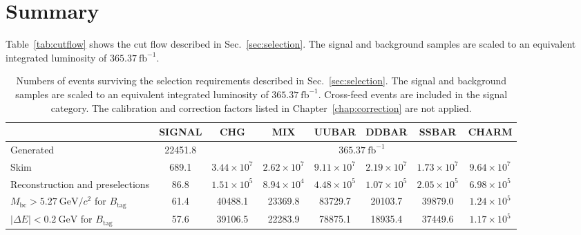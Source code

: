 \section{Summary}
Table~\ref{tab:cutflow} shows the cut flow described in Sec.~\ref{sec:selection}.
The signal and background samples are scaled to an equivalent integrated luminosity of $365.37~\textrm{fb}^{-1}$.
\begin{table}
\caption{
        Numbers of events surviving the selection requirements described
        in Sec.~\ref{sec:selection}.
        The signal and background samples are scaled to an equivalent
        integrated luminosity of $365.37~\textrm{fb}^{-1}$.
        Cross-feed events are included in the signal category.
        The calibration and correction factors listed in
        Chapter~\ref{chap:correction} are not applied.
    }
    \centering
    \renewcommand{\arraystretch}{1.2}
    \setlength{\tabcolsep}{5pt}
    \small

    \begin{tabularx}{0.95\textheight}{
        >{\raggedright\arraybackslash}X ||
        c | c | c | c | c | c | c
    }
        \hline
        \hline

        \multicolumn{1}{c||}{Selection}
        & SIGNAL
        & CHG
        & MIX
        & UUBAR
        & DDBAR
        & SSBAR
        & CHARM \\
        \hline

        Generated
        & 22451.8
        & \multicolumn{6}{c}{$365.37~\textrm{fb}^{-1}$} \\

        Skim
        & 689.1
        & $3.44\times10^{7}$
        & $2.62\times10^{7}$
        & $9.11\times10^{7}$
        & $2.19\times10^{7}$
        & $1.73\times10^{7}$
        & $9.64\times10^{7}$ \\

        Reconstruction and preselections
        & 86.8
        & $1.51\times10^{5}$
        & $8.94\times10^{4}$
        & $4.48\times10^{5}$
        & $1.07\times10^{5}$
        & $2.05\times10^{5}$
        & $6.98\times10^{5}$ \\

        $M_{\textrm{bc}} > 5.27~\textrm{GeV}/c^{2}$ for $B_{\textrm{tag}}$
        & 61.4
        & 40488.1
        & 23369.8
        & 83729.7
        & 20103.7
        & 39879.0
        & $1.24\times10^{5}$ \\

        $\left|\Delta E\right| < 0.2~\textrm{GeV}$ for $B_{\textrm{tag}}$
        & 57.6
        & 39106.5
        & 22283.9
        & 78875.1
        & 18935.4
        & 37449.6
        & $1.17\times10^{5}$ \\


\end{tabularx}
\end{table}
